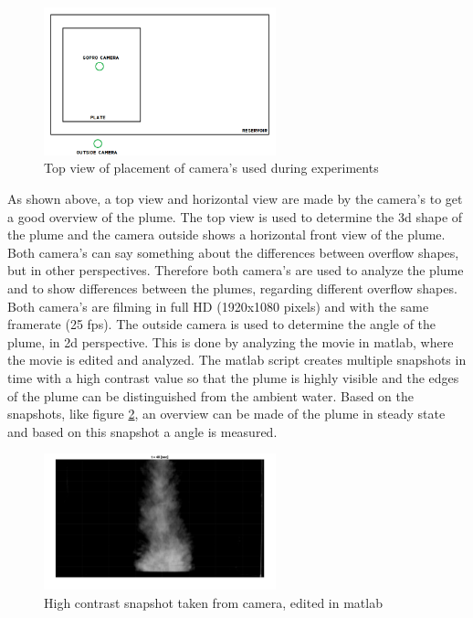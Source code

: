\begin{figure}[ht!]
    \centering
    \includegraphics[width=0.6\textwidth]{Images/Camera_overzicht.png}
    \caption{Top view of placement of camera's used during experiments }
    \label{fig:camera}
\end{figure}




\noindent As shown above, a top view and horizontal view are made by the camera's to get a good overview of the plume. The top view is used to determine the 3d shape of the plume and the camera outside shows a horizontal front view of the plume. Both camera's can say something about the differences between overflow shapes, but in other perspectives. Therefore both camera's are used to analyze the plume and to show differences between the plumes, regarding different overflow shapes. Both camera's are filming in full HD (1920x1080 pixels) and with the same framerate (25 fps). \newline
\noindent The outside camera is used to determine the angle of the plume, in 2d perspective. This is done by analyzing the movie in matlab, where the movie is edited and analyzed. The matlab script creates multiple snapshots in time with a high contrast value so that the plume is highly visible and the edges of the plume can be distinguished from the ambient water. Based on the snapshots, like figure \ref{fig:snapshot}, an overview can be made of the plume in steady state and based on this snapshot a angle is measured. 

\begin{figure}[ht!]
    \centering
    \includegraphics[width=0.6\textwidth]{Images/Round_5_t40.jpg}
    \caption{High contrast snapshot taken from camera, edited in matlab}
    \label{fig:snapshot}
\end{figure}


